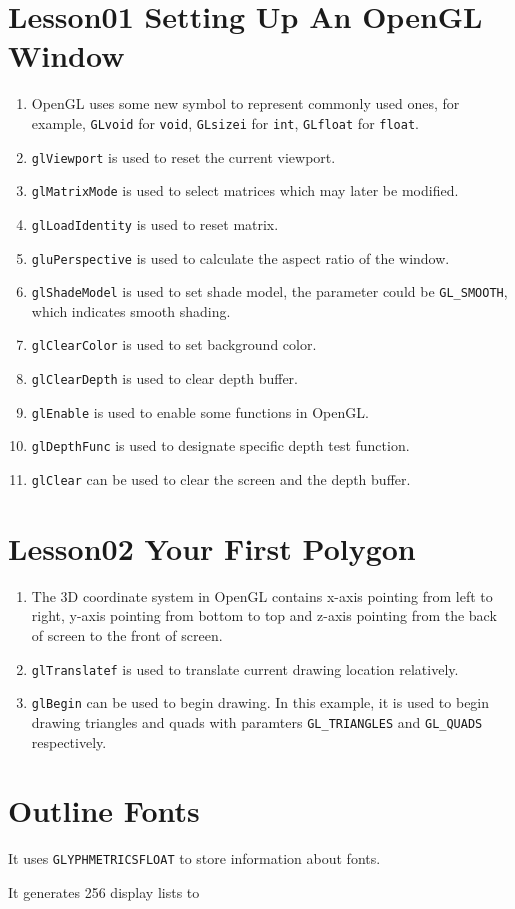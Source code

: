 \section{Lesson01 Setting Up An OpenGL Window}

\begin{enumerate}
	\item OpenGL uses some new symbol to represent commonly used ones, for example, \verb|GLvoid| for \verb|void|, \verb|GLsizei| for \verb|int|, \verb|GLfloat| for \verb|float|.
	\item \verb|glViewport| is used to reset the current viewport.
	\item \verb|glMatrixMode| is used to select matrices which may later be modified.
	\item \verb|glLoadIdentity| is used to reset matrix.
	\item \verb|gluPerspective| is used to calculate the aspect ratio of the window.
	\item \verb|glShadeModel| is used to set shade model, the parameter could be \verb|GL_SMOOTH|, which indicates smooth shading.
	\item \verb|glClearColor| is used to set background color.
	\item \verb|glClearDepth| is used to clear depth buffer.
	\item \verb|glEnable| is used to enable some functions in OpenGL.
	\item \verb|glDepthFunc| is used to designate specific depth test function.
	\item \verb|glClear| can be used to clear the screen and the depth buffer.
\end{enumerate}

\section{Lesson02 Your First Polygon}
\begin{enumerate}
	\item The 3D coordinate system in OpenGL contains x-axis pointing from left to right, y-axis pointing from bottom to top and z-axis pointing from the back of screen to the front of screen.
	\item \verb|glTranslatef| is used to translate current drawing location relatively.
	\item \verb|glBegin| can be used to begin drawing. In this example, it is used to begin drawing triangles and quads with paramters \verb|GL_TRIANGLES| and \verb|GL_QUADS| respectively.
\end{enumerate}


\section{Outline Fonts}

It uses \verb|GLYPHMETRICSFLOAT| to store information about fonts.

It generates 256 display lists to 


